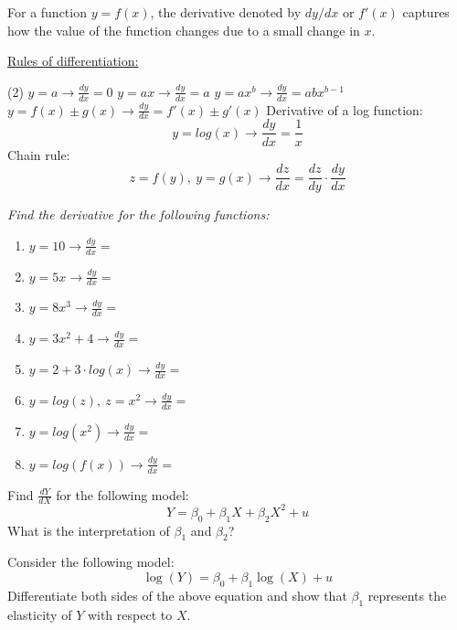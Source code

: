 \documentclass{./../../Latex/handout}
\begin{document}
\thispagestyle{plain}
\vspace{-1em}

For a function $ y = f(x) $, the derivative denoted by $dy/dx$ or $f'(x)$ captures how the value of the function changes due to a small change in $x$.

\underline{Rules of differentiation:}
\begin{tasks}(2)
\task $\displaystyle y=a  \rightarrow  \frac{dy}{dx}=0$
\task $\displaystyle y=ax \rightarrow \frac{dy}{dx}=a$
\task $\displaystyle y=ax^b \rightarrow  \frac{dy}{dx}=abx^{b-1}$
\task $\displaystyle y=f(x) \pm g(x) \rightarrow  \frac{dy}{dx}=f'(x) \pm g'(x)$ 
\task Derivative of a log function:
$$ y=log(x)  \rightarrow  \frac{dy}{dx}=\dfrac{1}{x}$$
\task Chain rule:
$$z=f(y),\ y=g(x) \rightarrow  \frac{d z}{d x}=\dfrac{d z}{d y} \cdot \frac{d y}{d x}$$
\end{tasks}
\vspace{-2em}

\textit{Find the derivative for the following functions:}
\begin{enumerate}
	\item $ \displaystyle y = 10 \rightarrow  \frac{dy}{dx}=$
	\item $ \displaystyle y = 5x \rightarrow  \frac{dy}{dx}=$
	\item $ \displaystyle y = 8x^3 \rightarrow  \frac{dy}{dx}=$
	\item $ \displaystyle y = 3x^2 + 4 \rightarrow  \frac{dy}{dx}= $
	\item $ \displaystyle y = 2 + 3 \cdot log(x)\rightarrow  \frac{dy}{dx}= $
	\item $ \displaystyle y = log(z),\ z = x^2 \rightarrow  \frac{dy}{dx}= $
	\item $ \displaystyle y = log(x^2) \rightarrow  \frac{dy}{dx}= $
	\item $ \displaystyle y = log(f(x)) \rightarrow  \frac{dy}{dx}=$
\end{enumerate}

\newpage 
Find $\frac{dY}{dX}$ for the following model:
$$ Y = \beta_0 + \beta_1 X + \beta_2 X^2 + u $$
What is the interpretation of $\beta_1$ and $\beta_2$?
\vspace{8cm}

Consider the following model:
$$ \log(Y) = \beta_0 +  \beta_1 \log(X) + u$$
Differentiate both sides of the above equation and show that \(\beta_1\) represents the elasticity of \(Y\) with respect to \(X\).
\end{document}
